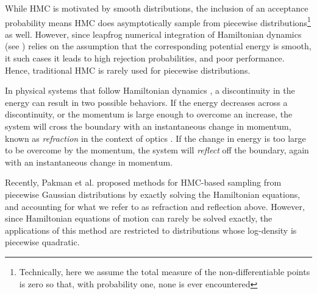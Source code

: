 \documentclass{article} %
\begin{document}

While HMC is motivated by smooth distributions, the inclusion of an acceptance probability means HMC does asymptotically sample from piecewise distributions\footnote{Technically, here we assume the total measure of the non-differentiable points is zero so that, with probability one, none is ever encountered} as well.  However, since leapfrog numerical integration of Hamiltonian dynamics (see \cite{neal2011mcmc}) relies on the assumption that the corresponding potential energy is smooth, it such cases it leads to high rejection probabilities, and poor performance.  Hence, traditional HMC is rarely used for piecewise distributions.

In physical systems that follow Hamiltonian dynamics \cite{greenwood1988principles}, a discontinuity in the energy can result in two possible behaviors.  If the energy decreases across a discontinuity, or the momentum is large enough to overcome an increase, the system will cross the boundary with an instantaneous change in momentum, known as \emph{refraction} in the context of optics \cite{buchdahl1993introduction}.  If the change in energy is too large to be overcome by the momentum, the system will \emph{reflect} off the boundary, again with an instantaneous change in momentum.



Recently, Pakman et al. \cite{pakman2014exact, pakman2013auxiliary} proposed methods for HMC-based sampling from piecewise Gaussian distributions by exactly solving the Hamiltonian equations, and accounting for what we refer to as refraction and reflection above.  However, since Hamiltonian equations of motion can rarely be solved exactly, the applications of this method are restricted to distributions whose log-density is piecewise quadratic.

\end{document}
